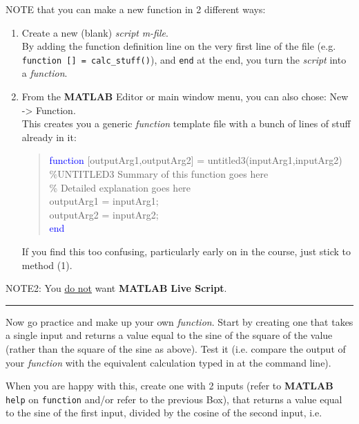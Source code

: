 \documentclass{tufte-book} %
\newenvironment{docspec}{\begin{quotation}\ttfamily\parskip0pt\parindent0pt\ignorespaces}{\end{quotation}}
\begin{document}
\newpage
NOTE that you can make a new function in 2 different ways:
\begin{enumerate}[noitemsep]
\vspace{1mm}
\item Create a new (blank) \textit{script} \textit{m-file}.
\\By adding the function definition line on the very first line of the file (e.g. \texttt{function [] = calc\_stuff()}), and \texttt{end} at the end, you turn the \textit{script} into a \textit{function}.
\vspace{1mm}
\item From the \textbf{MATLAB} \textsf{Editor} or main window menu, you can also chose: \textsf{New} -> \textsf{Function}.
\\This creates you a generic \textit{function} template file with a bunch of lines of stuff already in it:
\begin{docspec}
\textcolor{blue}{function} [outputArg1,outputArg2] = untitled3(inputArg1,inputArg2)
\\\textcolor[rgb]{0,0.501961,0}{\%UNTITLED3 Summary of this function goes here
\\\%   Detailed explanation goes here}
\\outputArg1 = inputArg1;
\\outputArg2 = inputArg2;
\\\textcolor{blue}{end}
\end{docspec}
If you find this too confusing, particularly early on in the course, just stick to method (1).
\end{enumerate}

NOTE2: You \uline{do not} want \textbf{MATLAB} \textbf{Live Script}.

\vspace{1mm}
\noindent\rule{4cm}{0.5pt}
\vspace{2mm}

\noindent Now go practice and make up your own \textit{function}. Start by creating one that takes a single input and returns a value equal to the sine of the square of the value (rather than the square of the sine as above). Test it (i.e. compare the output of your \textit{function} with the equivalent calculation typed in at the command line).

When you are happy with this, create one with 2 inputs (refer to \textbf{MATLAB} \texttt{help} on \texttt{function} and/or refer to the previous Box), that returns a value equal to the sine of the first input, divided by the cosine of the second input, i.e.
\end{document}
